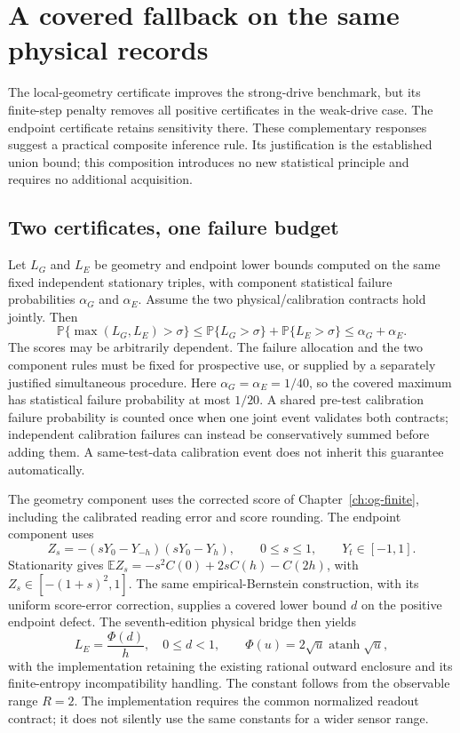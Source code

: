 \chapter{A covered fallback on the same physical records}
\label{ch:og-combination}

The local-geometry certificate improves the strong-drive benchmark, but its
finite-step penalty removes all positive certificates in the weak-drive case.
The endpoint certificate retains sensitivity there. These complementary
responses suggest a practical composite inference rule. Its justification is
the established union bound; this composition introduces no new statistical
principle and requires no additional acquisition.

\section{Two certificates, one failure budget}
Let $L_G$ and $L_E$ be geometry and endpoint lower bounds computed on the
same fixed independent stationary triples, with component statistical failure
probabilities $\alpha_G$ and $\alpha_E$. Assume the two physical/calibration
contracts hold jointly. Then
\begin{equation}
 \mathbb P\{\max(L_G,L_E)>\sigma\}
 \le \mathbb P\{L_G>\sigma\}+\mathbb P\{L_E>\sigma\}
 \le \alpha_G+\alpha_E.
 \label{eq:og-combined-union}
\end{equation}
The scores may be arbitrarily dependent. The failure allocation and the two
component rules must be fixed for prospective use, or supplied by a separately
justified simultaneous procedure. Here $\alpha_G=\alpha_E=1/40$, so the covered
maximum has statistical failure probability at most $1/20$. A shared pre-test
calibration failure probability is counted once when one joint event validates
both contracts; independent calibration failures can instead be conservatively
summed before adding them. A same-test-data calibration event does not inherit
this guarantee automatically.

The geometry component uses the corrected score of
Chapter~\ref{ch:og-finite}, including the calibrated reading error and score
rounding. The endpoint component uses
\begin{equation}
 Z_s=-(sY_0-Y_{-h})(sY_0-Y_h),\qquad 0\le s\le1,
 \qquad Y_t\in[-1,1].
\end{equation}
Stationarity gives
$\mathbb E Z_s=-s^2 C(0)+2sC(h)-C(2h)$, with
$Z_s\in[-(1+s)^2,1]$. The same empirical-Bernstein construction, with its
uniform score-error correction, supplies a covered lower bound $d$ on the
positive endpoint defect. The seventh-edition physical bridge then yields
\begin{equation}
 L_E=\frac{\Phi(d)}h,\quad 0\le d<1,\qquad
 \Phi(u)=2\sqrt u\operatorname{atanh}\sqrt u,
\end{equation}
with the implementation retaining the existing rational outward enclosure and
its finite-entropy incompatibility handling. The constant follows from the
observable range $R=2$. The implementation requires the common normalized
readout contract; it does not silently use the same constants for a wider
sensor range.

